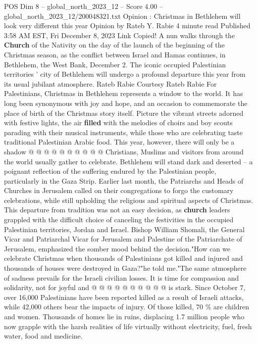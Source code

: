 \begin{textsample}{POS Dim 8 – global\_north\_2023\_12 – Score 4.00 – global\_north\_2023\_12/200048321.txt}  \label{ex:f8_pos_273}
Opinion : Christmas in Bethlehem will look very different this year Opinion by Rateb Y.
Rabie 4 minute read Published 3:58 AM EST, Fri December 8, 2023 Link Copied!
A nun walks through the \textbf{Church} of the Nativity on the day of the launch of the beginning of the Christmas season, as the conflict between Israel and Hamas continues, in Bethlehem, the West Bank, December 2.
The iconic occupied Palestinian territories ' city of Bethlehem will undergo a profound departure this year from its usual jubilant atmosphere.
Rateb Rabie Courtesy Rateb Rabie For Palestinians, Christmas in Bethlehem represents a window to the world.
It has long been synonymous with joy and hope, and an occasion to commemorate the place of birth of the Christmas story itself.
Picture the vibrant streets adorned with festive lights, the air \textbf{filled} with the melodies of choirs and boy scouts parading with their musical instruments, while those who are celebrating taste traditional Palestinian Arabic food.
This year, however, there will only be a shadow @ @ @ @ @ @ @ @ @ @ Christians, Muslims and visitors from around the world usually gather to celebrate.
Bethlehem will stand dark and deserted -- a poignant reflection of the suffering endured by the Palestinian people, particularly in the Gaza Strip.
Earlier last month, the Patriarchs and Heads of Churches in Jerusalem called on their congregations to forgo the customary celebrations, while still upholding the religious and spiritual aspects of Christmas.
This departure from tradition was not an easy decision, as \textbf{church} leaders grappled with the difficult choice of canceling the festivities in the occupied Palestinian territories, Jordan and Israel.
Bishop William Shomali, the General Vicar and Patriarchal Vicar for Jerusalem and Palestine of the Patriarchate of Jerusalem, emphasized the somber mood behind the decision."How can we celebrate Christmas when thousands of Palestinians got killed and injured and thousands of houses were destroyed in Gaza?"he told me."The same atmosphere of sadness prevails for the Israeli civilian losses.
It is time for compassion and solidarity, not for joyful and @ @ @ @ @ @ @ @ @ @ is stark.
Since October 7, over 16,000 Palestinians have been reported killed as a result of Israeli attacks, while 42,000 others bear the impacts of injury.
Of those killed, 70 \% are children and women.
Thousands of homes lie in ruins, displacing 1.7 million people who now grapple with the harsh realities of life virtually without electricity, fuel, fresh water, food and medicine.

\end{textsample}
